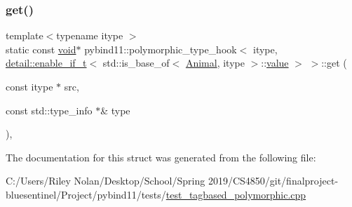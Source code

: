 \subsubsection{\texorpdfstring{get()}{get()}}
{\footnotesize\ttfamily template$<$typename itype $>$ \\
static const \mbox{\hyperlink{_s_d_l__opengles2__gl2ext_8h_ae5d8fa23ad07c48bb609509eae494c95}{void}}$\ast$ pybind11\+::polymorphic\+\_\+type\+\_\+hook$<$ itype, \mbox{\hyperlink{detail_2common_8h_a012819c9e8b5e04872a271f50f8b8196}{detail\+::enable\+\_\+if\+\_\+t}}$<$ std\+::is\+\_\+base\+\_\+of$<$ \mbox{\hyperlink{struct_animal}{Animal}}, itype $>$\+::\mbox{\hyperlink{_s_d_l__opengl__glext_8h_a8ad81492d410ff2ac11f754f4042150f}{value}} $>$ $>$\+::get (\begin{DoxyParamCaption}\item[{const itype $\ast$}]{src,  }\item[{const std\+::type\+\_\+info $\ast$\&}]{type }\end{DoxyParamCaption})\hspace{0.3cm}{\ttfamily [inline]}, {\ttfamily [static]}}



The documentation for this struct was generated from the following file\+:\begin{DoxyCompactItemize}
\item 
C\+:/\+Users/\+Riley Nolan/\+Desktop/\+School/\+Spring 2019/\+C\+S4850/git/finalproject-\/bluesentinel/\+Project/pybind11/tests/\mbox{\hyperlink{test__tagbased__polymorphic_8cpp}{test\+\_\+tagbased\+\_\+polymorphic.\+cpp}}\end{DoxyCompactItemize}
